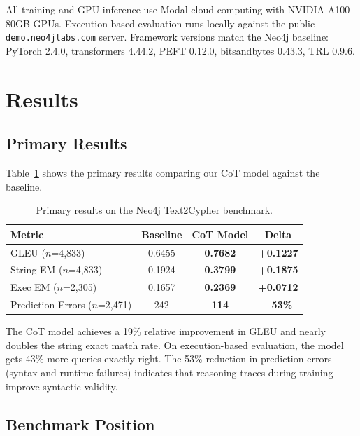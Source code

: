 \documentclass[11pt]{article}
\begin{document}
All training and GPU inference use Modal cloud computing with NVIDIA A100-80GB GPUs. Execution-based evaluation runs locally against the public \texttt{demo.neo4jlabs.com} server. Framework versions match the Neo4j baseline: PyTorch 2.4.0, transformers 4.44.2, PEFT 0.12.0, bitsandbytes 0.43.3, TRL 0.9.6.

\section{Results}

\subsection{Primary Results}

Table~\ref{tab:primary} shows the primary results comparing our CoT model against the baseline.

\begin{table}[h]
\centering
\caption{Primary results on the Neo4j Text2Cypher benchmark.}
\label{tab:primary}
\begin{tabular}{lccc}
\toprule
\textbf{Metric} & \textbf{Baseline} & \textbf{CoT Model} & \textbf{Delta} \\
\midrule
GLEU ($n$=4,833) & 0.6455 & \textbf{0.7682} & \textbf{+0.1227} \\
String EM ($n$=4,833) & 0.1924 & \textbf{0.3799} & \textbf{+0.1875} \\
Exec EM ($n$=2,305) & 0.1657 & \textbf{0.2369} & \textbf{+0.0712} \\
Prediction Errors ($n$=2,471) & 242 & \textbf{114} & \textbf{$-$53\%} \\
\bottomrule
\end{tabular}
\end{table}

The CoT model achieves a 19\% relative improvement in GLEU and nearly doubles the string exact match rate. On execution-based evaluation, the model gets 43\% more queries exactly right. The 53\% reduction in prediction errors (syntax and runtime failures) indicates that reasoning traces during training improve syntactic validity.

\subsection{Benchmark Position}
\end{document}
